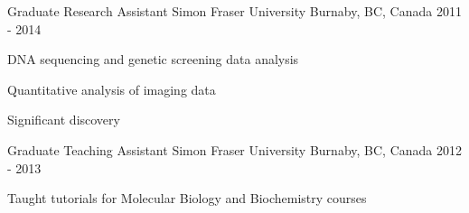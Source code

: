 \begin{cventries}
\cventry
{Graduate Research Assistant} %
{Simon Fraser University} %
{Burnaby, BC, Canada} %
{2011 - 2014} %
{ %
\begin{cvitems}
\item {DNA sequencing and genetic screening data analysis}
\item {Quantitative analysis of imaging data}
\item {Significant discovery
}
\end{cvitems}
}

\cventry
{Graduate Teaching Assistant} %
{Simon Fraser University} %
{Burnaby, BC, Canada} %
{2012 - 2013} %
{ %
\begin{cvitems}
\item {Taught tutorials for Molecular Biology and Biochemistry courses}
\end{cvitems}
}



\end{cventries}